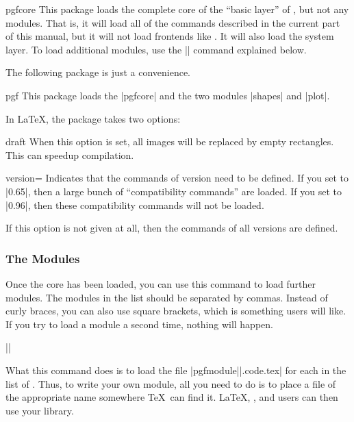 \begin{package}{pgfcore}
    This package loads the complete core of the ``basic layer'' of \pgfname,
    but not any modules. That is, it will load all of the commands described in
    the current part of this manual, but it will not load frontends like
    \tikzname. It will also load the system layer. To load additional modules,
    use the |\usepgfmodule| command explained below.
\end{package}

The following package is just a convenience.

\begin{package}{pgf}
    This package loads the |pgfcore| and the two modules |shapes| and |plot|.

    In \LaTeX, the package takes two options:
    \begin{packageoption}{draft}
        When this option is set, all images will be replaced by empty
        rectangles. This can speedup compilation.
    \end{packageoption}

    \begin{packageoption}{version=}
        Indicates that the commands of version  need to be
        defined. If you set  to |0.65|, then a large bunch of
        ``compatibility commands'' are loaded. If you set  to
        |0.96|, then these compatibility commands will not be loaded.

        If this option is not given at all, then the commands of all versions
        are defined.
    \end{packageoption}
\end{package}


\subsubsection{The Modules}

\begin{command}{\usepgfmodule{}}
    Once the core has been loaded, you can use this command to load further
    modules. The modules in the  list should be separated by
    commas. Instead of curly braces, you can also use square brackets, which is
    something  users will like. If you try to load a module a second
    time, nothing will happen.

    \example ||

    What this command does is to load the file
    |pgfmodule||.code.tex| for each  in the list of
    . Thus, to write your own module, all you need to do is
    to place a file of the appropriate name somewhere \TeX\ can find it.
    \LaTeX, , and  users can then use your library.
\end{command}

